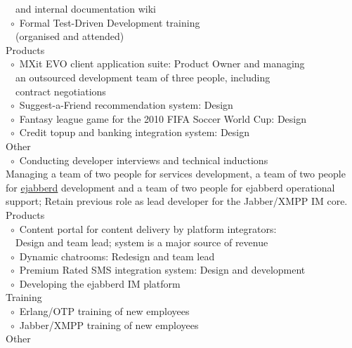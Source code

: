 \documentclass[10pt,a4paper,final]{columncv}
\begin{document}
\begin{cvenv}
{          ~\phantom{$\circ$}~and internal documentation wiki \\
          ~$\circ$~Formal Test-Driven Development training \\
          ~\phantom{$\circ$}~(organised and attended) \\
          Products \\
          ~$\circ$~MXit EVO client application suite: Product Owner and managing \\
          ~\phantom{$\circ$}~an outsourced development team of three people, including \\
          ~\phantom{$\circ$}~contract negotiations \\
          ~$\circ$~Suggest-a-Friend recommendation system: Design \\
          ~$\circ$~Fantasy league game for the 2010 FIFA Soccer World Cup: Design \\
          ~$\circ$~Credit topup and banking integration system: Design \\
          Other \\
          ~$\circ$~Conducting developer interviews and technical inductions \\}
         {Managing a team of two people for services development, a team of two people for 
          \href{http://www.process-one.net/en/ejabberd/}{ejabberd} development and a team 
          of two people for ejabberd operational support; 
          Retain previous role as lead developer for the Jabber/XMPP IM core.}
          {Products \\
           ~$\circ$~Content portal for content delivery by platform integrators: \\
           ~\phantom{$\circ$}~Design and team lead; system is a major source of revenue \\ 
           ~$\circ$~Dynamic chatrooms: Redesign and team lead \\
           ~$\circ$~Premium Rated SMS integration system: Design and development \\
           ~$\circ$~Developing the ejabberd IM platform \\
           Training \\
           ~$\circ$~Erlang/OTP training of new employees \\
           ~$\circ$~Jabber/XMPP training of new employees \\
           Other \\
}
\end{cvenv}
\end{document}
